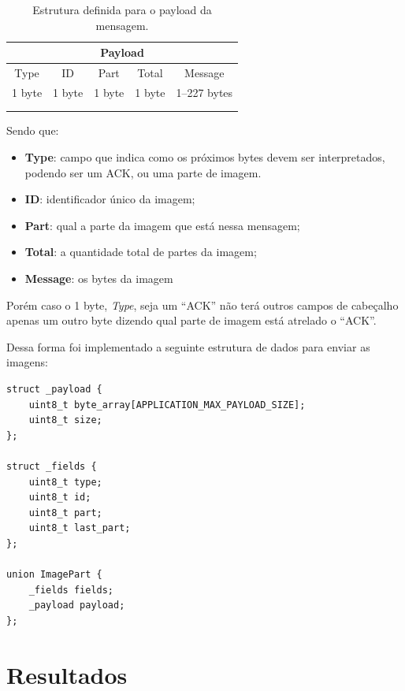 \documentclass[
article,			%
12pt,				%
oneside,			%
a4paper,			%
english,			%
brazil,				%
sumario=tradicional
]{abntex2}
\begin{document}
\begin{table}[h]
\caption{Estrutura definida para o payload da mensagem.}
\centering
\begin{tabular}{cllll}
\hline
\multicolumn{5}{|c|}{Payload}    \\ \hline
\multicolumn{1}{|c|}{Type}   & \multicolumn{1}{c|}{ID}     & \multicolumn{1}{c|}{Part}   & \multicolumn{1}{c|}{Total}  & \multicolumn{1}{c|}{Message}      \\ \hline
\multicolumn{1}{|c|}{1 byte} & \multicolumn{1}{c|}{1 byte} & \multicolumn{1}{c|}{1 byte} & \multicolumn{1}{c|}{1 byte} & \multicolumn{1}{c|}{1--227 bytes} \\ \hline
\multicolumn{1}{l}{} &  &  &  &  \\
\multicolumn{1}{l}{} &  &  &  & 
\end{tabular}
\end{table}

Sendo que:
\begin{itemize}
    \item\textbf{Type}: campo que indica como os próximos bytes devem ser interpretados, podendo ser um ACK, ou uma parte de imagem.
    \item\textbf{ID}: identificador único da imagem;
    \item\textbf{Part}: qual a parte da imagem que está nessa mensagem;
    \item\textbf{Total}: a quantidade total de partes da imagem;
    \item\textbf{Message}: os bytes da imagem
\end{itemize}

Porém caso o 1 byte, \textit{Type}, seja um ``ACK'' não terá outros campos de cabeçalho apenas um outro byte dizendo qual parte de imagem está atrelado o ``ACK''.

Dessa forma foi implementado a seguinte estrutura de dados para enviar as imagens:

\begin{lstlisting}[title=Definição da estrutura do payload]
struct _payload {
    uint8_t byte_array[APPLICATION_MAX_PAYLOAD_SIZE];
    uint8_t size;
};

struct _fields {
    uint8_t type;
    uint8_t id;
    uint8_t part;
    uint8_t last_part;
};

union ImagePart {
    _fields fields;
    _payload payload;
};
\end{lstlisting}

\section{Resultados}\label{Resultados}
\end{document}
